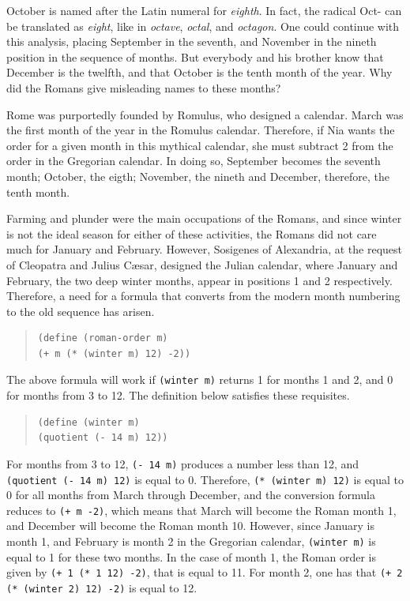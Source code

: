 \documentclass[a4paper,12pt]{book}
\begin{document}
October is named after the Latin numeral for {\em eighth}.
In fact, the radical {\sc Oct-} can be translated
as {\em eight}, like in
{\em octave}, {\em octal}, and {\em octagon}.
One could continue with this analysis,
placing September in the seventh,
and November in the nineth position
in the sequence of months.
But everybody and
his brother know that December is the
twelfth, and that
October is the tenth month of the
year. Why did the Romans give misleading
names to these months?

Rome was purportedly founded by Romulus,
who designed a calendar.
March was the first month of the year
in the Romulus calendar. Therefore, if Nia
wants the order for a given month in
this mythical calendar, she must
subtract 2 from the order
in the Gregorian calendar.
In doing so, September becomes the
seventh month; October, the eigth;
November, the nineth and
December, therefore, the tenth month.

Farming and plunder were the main
occupations of the Romans, and since winter
is not the ideal season for
either of these activities,
the Romans did not care much for
January and February. However,
Sosigenes of Alexandria,
at the request of Cleopatra and
Julius C\ae sar, designed the
Julian calendar, where January
and February, the two deep winter
months, appear in  positions
1 and 2 respectively.
Therefore, a need for a formula
that converts from the modern
month numbering to the
old sequence has arisen.
\begin{quote}
\begin{verbatim}
(define (roman-order m)
(+ m (* (winter m) 12) -2))
\end{verbatim}
\end{quote}
The above formula will work if \verb|(winter m)|
returns 1 for months 1 and 2, and
0 for months from 3 to 12. The definition
below satisfies these requisites.
\begin{quote}
\begin{verbatim}
(define (winter m)
(quotient (- 14 m) 12))
\end{verbatim}
\end{quote}
For months from 3 to 12,
\verb|(- 14 m)| produces a number
less than 12, and \verb|(quotient (- 14 m) 12)|
is equal to 0. Therefore,
\verb|(* (winter m) 12)| is equal to
0 for all months from March through December,
and the conversion formula reduces
to \verb|(+ m -2)|, which means that
March will become the Roman month 1, and December
will become the Roman month 10.
However, since January is month 1,
and February is month 2 in the Gregorian
calendar, \verb|(winter m)| is
equal to 1 for these two months.
In the case of month 1,
the Roman order is given by
\verb|(+ 1 (* 1 12) -2)|, that is
equal to 11. For month 2, one has that
\verb|(+ 2 (* (winter 2) 12) -2)|
is equal to 12.
\end{document}

